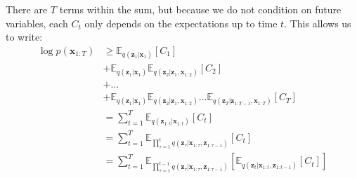 There are $T$ terms within the sum, but because we do not condition on future variables, each $C_t$ only depends on the expectations up to time $t$. This allows us to write:
\begin{align}
    \log p(\mathbf{x}_{1:T}) & \geq \mathbb{E}_{q(\mathbf{z}_1 | \mathbf{x}_1)} \left[ C_1 \right] \nonumber \\ 
    & + \mathbb{E}_{q(\mathbf{z}_1 | \mathbf{x}_1)} \mathbb{E}_{q(\mathbf{z}_2 | \mathbf{z}_1 , \mathbf{x}_{1:2})} \left[ C_2 \right] \nonumber \\
    & + \dots \nonumber \\
    & + \mathbb{E}_{q(\mathbf{z}_1 | \mathbf{x}_1)} \mathbb{E}_{q(\mathbf{z}_2 | \mathbf{z}_1 , \mathbf{x}_{1:2})} \dots \mathbb{E}_{q(\mathbf{z}_T | \mathbf{z}_{1:T-1} , \mathbf{x}_{1:T})} \left[ C_T \right] \\
    & = \sum_{t=1}^T \mathbb{E}_{q(\mathbf{z}_{1:t} | \mathbf{x}_{1:t})} \left[ C_t \right] \\
    & = \sum_{t=1}^T \mathbb{E}_{\prod_{\tau=1}^t q(\mathbf{z}_\tau | \mathbf{x}_{1:\tau} , \mathbf{z}_{1:\tau-1})} \left[ C_t \right] \\
    & = \sum_{t=1}^T \mathbb{E}_{\prod_{\tau=1}^{t-1} q(\mathbf{z}_\tau | \mathbf{x}_{1:\tau} , \mathbf{z}_{1:\tau-1})} \left[ \mathbb{E}_{q(\mathbf{z}_t | \mathbf{x}_{1:t} , \mathbf{z}_{1:t-1})} \left[ C_t \right] \right]
\end{align}
